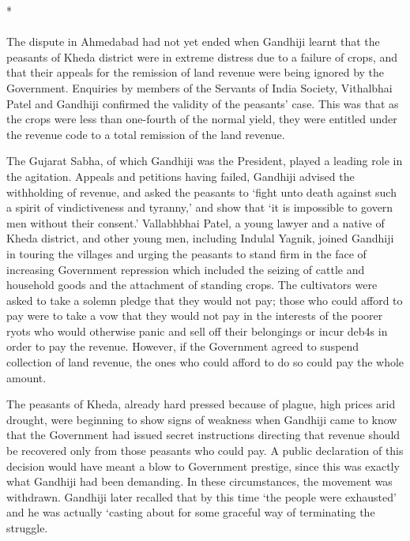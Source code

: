 \begin{center}*\end{center}

\paragraph*{}


The dispute in Ahmedabad had not yet ended when Gandhiji learnt that the peasants of Kheda district were in extreme distress due to a failure of crops, and that their appeals for the remission of land revenue were being ignored by the Government. Enquiries by members of the Servants of India Society, Vithalbhai Patel and Gandhiji confirmed the validity of the peasants' case. This was that as the crops were less than one-fourth of the normal yield, they were entitled under the revenue code to a total remission of the land revenue.

The Gujarat Sabha, of which Gandhiji was the President, played a leading role in the agitation. Appeals and petitions having failed, Gandhiji advised the withholding of revenue, and asked the peasants to `fight unto death against such a spirit of vindictiveness and tyranny,' and show that `it is impossible to govern men without their consent.' Vallabhbhai Patel, a young lawyer and a native of Kheda district, and other young men, including Indulal Yagnik, joined Gandhiji in touring the villages and urging the peasants to stand firm in the face of increasing Government repression which included the seizing of cattle and household goods and the attachment of standing crops. The cultivators were asked to take a solemn pledge that they would not pay; those who could afford to pay were to take a vow that they would not pay in the interests of the poorer ryots who would otherwise panic and sell off their belongings or incur deb4s in order to pay the revenue. However, if the Government agreed to suspend collection of land revenue, the ones who could afford to do so could pay the whole amount.

The peasants of Kheda, already hard pressed because of plague, high prices arid drought, were beginning to show signs of weakness when Gandhiji came to know that the Government had issued secret instructions directing that revenue should be recovered only from those peasants who could pay. A public declaration of this decision would have meant a blow to Government prestige, since this was exactly what Gandhiji had been demanding. In these circumstances, the movement was withdrawn. Gandhiji later recalled that by this time `the people were exhausted' and he was actually `casting about for some graceful way of terminating the struggle.


